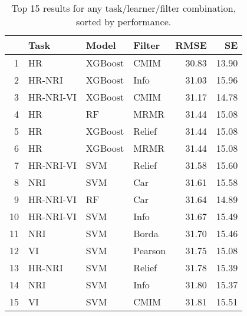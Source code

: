 \begin{table}[ht!]
\centering
\caption{Top 15 results for any task/learner/filter combination, sorted by performance.} 
\label{tab:perf-top-15}
\begin{tabular}{rlllrr}
  \hline
 & Task & Model & Filter & RMSE & SE \\ 
  \hline
1 & HR & XGBoost & CMIM & 30.83 & 13.90 \\ 
  2 & HR-NRI & XGBoost & Info & 31.03 & 15.96 \\ 
  3 & HR-NRI-VI & XGBoost & CMIM & 31.17 & 14.78 \\ 
  4 & HR & RF & MRMR & 31.44 & 15.08 \\ 
  5 & HR & XGBoost & Relief & 31.44 & 15.08 \\ 
  6 & HR & XGBoost & MRMR & 31.44 & 15.08 \\ 
  7 & HR-NRI-VI & SVM & Relief & 31.58 & 15.60 \\ 
  8 & NRI & SVM & Car & 31.61 & 15.58 \\ 
  9 & HR-NRI-VI & RF & Car & 31.64 & 14.89 \\ 
  10 & HR-NRI-VI & SVM & Info & 31.67 & 15.49 \\ 
  11 & NRI & SVM & Borda & 31.70 & 15.46 \\ 
  12 & VI & SVM & Pearson & 31.75 & 15.08 \\ 
  13 & HR-NRI & SVM & Relief & 31.78 & 15.39 \\ 
  14 & NRI & SVM & Info & 31.80 & 15.37 \\ 
  15 & VI & SVM & CMIM & 31.81 & 15.51 \\ 
   \hline
\end{tabular}
\end{table}
